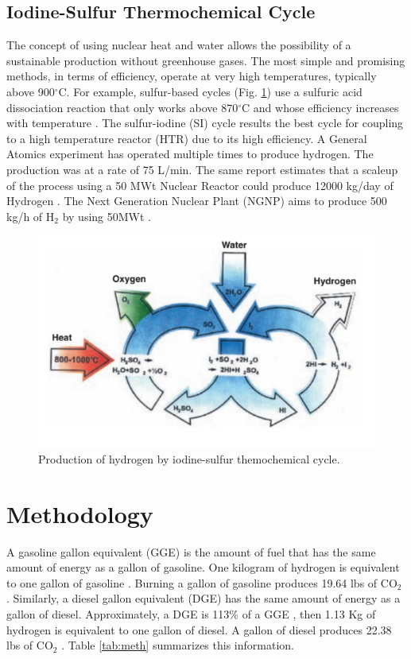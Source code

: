 \documentclass{anstrans}
\begin{document}
\subsection{Iodine-Sulfur Thermochemical Cycle}

The concept of using nuclear heat and water allows the possibility of a sustainable production without greenhouse gases. The most simple and promising methods, in terms of efficiency, operate at very high temperatures, typically above 900$^{\circ}$C. For example, sulfur-based cycles (Fig. \ref{fig:isulfur}) use a sulfuric acid dissociation reaction that only works above 870$^{\circ}$C and whose efficiency increases with temperature \cite{cea_gas-cooled_2006}. The sulfur-iodine (SI) cycle results the best cycle for coupling to a high temperature reactor (HTR) due to its high efficiency. A General Atomics experiment has operated multiple times to produce hydrogen. The production was at a rate of 75 L/min. The same report estimates that a scaleup of the process using a 50 MWt Nuclear Reactor could produce 12000 kg/day of Hydrogen \cite{benjamin_russ_sulfur_2009}.
The Next Generation Nuclear Plant (NGNP) \cite{macdonald_ngnp_2003} aims to produce 500 kg/h of H$_2$ by using 50MWt \cite{cea_gas-cooled_2006}.

\begin{figure}[H]
	\centering
	\includegraphics[width=0.85\linewidth]{figures/iodine-sulfur.png}
	\hfill
	\caption{Production of hydrogen by iodine-sulfur themochemical cycle.}
	\label{fig:isulfur}
\end{figure}

\section{Methodology}
\label{method}

A gasoline gallon equivalent (GGE) is the amount of fuel that has the same amount of energy as a gallon of gasoline. One kilogram of hydrogen is equivalent to one gallon of gasoline \cite{noauthor_hydrogen_nodate}. Burning a gallon of gasoline produces 19.64 lbs of CO$_2$ \cite{noauthor_how_2014}. 
Similarly, a diesel gallon equivalent (DGE) has the same amount of energy as a gallon of diesel. Approximately, a DGE is 113\% of a GGE \cite{noauthor_fuel_2014}, then 1.13 Kg of hydrogen is equivalent to one gallon of diesel.
A gallon of diesel produces 22.38 lbs of CO$_2$ \cite{noauthor_how_2014}. 
Table \ref{tab:meth} summarizes this information.
\end{document}
